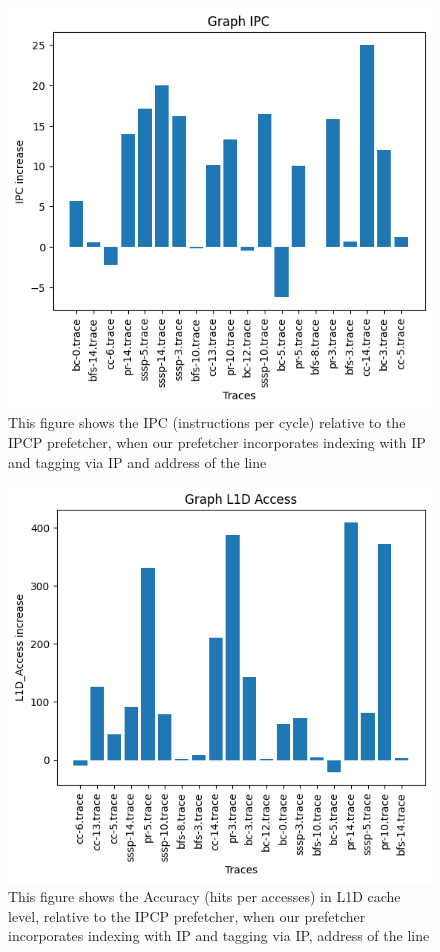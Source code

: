 \documentclass[conference]{IEEEtran}
\begin{document}
\begin{figure}
\includegraphics[scale=0.5]{Images/graph_ipc.png}
\caption{This figure shows the IPC (instructions per cycle) relative to the IPCP prefetcher, when our prefetcher incorporates indexing with IP and tagging via IP and address of the line}
\label{graph_ipc}
\end{figure}
\begin{figure}
\includegraphics[scale=0.5]{Images/graph_l1d.png}
\caption{This figure shows the Accuracy (hits per accesses) in L1D cache level, relative to the IPCP prefetcher, when our prefetcher incorporates indexing with IP and tagging via IP, address of the line}
\label{graph_l1d}
\end{figure}
\end{document}
